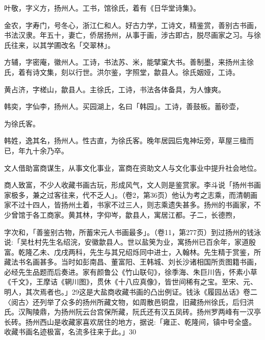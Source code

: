 \begin{BookQuote}
叶敬，字义方，扬州人。工书，馆徐氏，着有《日华堂诗集》。
\end{BookQuote}

\begin{BookQuote}
金农，字寿门，号冬心，浙江仁和人。好古力学，工诗文，精鉴赏，善别古书画，书法汉隶。年五十，妻亡，侨居扬州，从事于画，涉古即古，脱尽画家之习。与徐氏往来，以其学圃改名「交翠林」。
\end{BookQuote}

\begin{BookQuote}
方辅，字密庵，徽州人。工诗，书法苏、米，能擘窠大书。善制墨，来扬州主徐氏，着有诗文集，刻以行世。洪尔鉴，字照堂，歙县人。徐氏姻娅，工诗。
\end{BookQuote}

\begin{BookQuote}
黄占济，字槎山，歙县人。主徐氏，工诗，书法各体备具，为人慷爽。
\end{BookQuote}

\begin{BookQuote}
韩奕，字仙李，扬州人。买园湖上，名曰「韩园」。工诗，善鼓板。蓄砂壶，
\end{BookQuote}

为徐氏客。

\begin{BookQuote}
韩姓，逸其名，扬州人。性古直，为徐氏客。晚年居园后鬼神坛旁，草屋三楹而已，年九十余乃卒。
\end{BookQuote}

文人借助富商谋生，从事文化事业，富商在资助文人与文化事业中提升社会地位。

商人致富，不少人收藏书画古玩，形成风气，文人则是鉴赏家。李斗说「扬州书画家极多，兼之过客往来，代不乏人」。（卷2，第36页）他认为考之志乘，而清朝画家不过十四人，皆扬州土着，书家不过三人，则志乘遗失甚多。扬州的书画家，不少曾馆于各工商家。黄其林，字仰岑，歙县人，寓居江都。子二，长德煦，


\noindent 字次和，「善鉴别古物，所蓄宋元人书画最多」。（卷11，第277页）到过扬州的钱泳说:「吴杜村先生名绍浣，安徽歙县人。世以盐䇲为业，寓扬州已百余年，家道殷富。乾隆乙未、戊戌两科，先生与其兄绍烁同中进士，入翰林。先生精于赏鉴，所藏法书名画甚多。当时如彭南昌、董富阳、王韩城、刘长沙诸相国所贡图籍书画，必经先生品题而后奏进。家有颜鲁公《竹山联句》，徐季海、朱巨川告，怀素小草《千文》，王摩诘《辋川图》，贯休《十八应真像》，皆世间稀有之宝。至宋、元、明人，其次焉者也。」29这是大盐商收藏书画的凸出例证。钱泳《履园丛话》卷二〈阅古〉还列举了众多的扬州所藏文物，如周散邑铜盘，旧藏扬州徐氏，后归洪氏。汉陶陵鼎，为扬州阮云台宫保所藏，阮氏还有汉五凤砖。扬州罗两峰有一汉亭长砖。扬州西山是收藏家喜欢居住的地方，据说:「雍正、乾隆间，镇中号全盛。收藏书画名迹极富，名流多往来于此。」30

